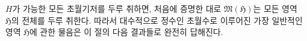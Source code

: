 
$H$가 가능한 모든 초월기저를 두루 취하면, 처음에 증명한 대로 $\mathfrak M(\mathfrak H)$는 모든 영역 $\mathfrak H$의 전체를 두루 취한다. 따라서 대수적으로 정수인 초월수로 이루어진 가장 일반적인 영역 $\mathfrak H$에 관한 물음은 이 절의 다음 결과들로 완전히 답해진다.
